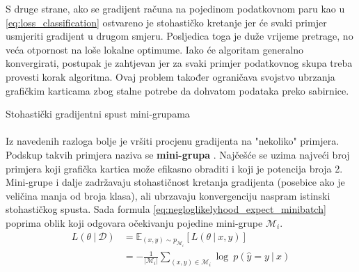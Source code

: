 \documentclass[times, utf8, numeric, diplomski]{fer}
\def\expect{\mathbb{E}}
\def\probsep{\ |\ }
\def\dataset{\mathcal{D}}
\def\minibatch{\mathcal{M}}
\begin{document}
S druge strane, ako se gradijent računa na pojedinom podatkovnom paru kao u \eqref{eq:loss_classification} ostvareno je stohastičko kretanje jer će svaki primjer usmjeriti gradijent u drugom smjeru. Posljedica toga je duže vrijeme pretrage, no veća otpornost na loše lokalne optimume. Iako će algoritam generalno konvergirati, postupak je zahtjevan jer za svaki primjer podatkovnog skupa treba provesti korak algoritma. Ovaj problem također ograničava svojstvo ubrzanja grafičkim karticama zbog stalne potrebe da dohvatom podataka preko sabirnice.

\begin{algorithm}[H]
\begin{algorithmic}
	\FOR{$\minibatch_i \in \dataset$} \STATE {
		$\vec{g}_i \gets \frac{1}{|\minibatch|} \sum_{(\vec{x},\vec{y})\in\minibatch} \vec{\nabla}_{\theta} L(\theta \probsep \vec{x},\vec{y})$ \\
		$\vec{\theta}_{i+1} \gets \vec{\theta}_i - \eta \cdot \vec{g_i}$
	 } \ENDFOR
\ENDWHILE
{}
\end{algorithmic}
\caption{Stohastički gradijentni spust mini-grupama}
\label{alg:sgd}
\end{algorithm}

\paragraph{}
Iz navedenih razloga bolje je vršiti procjenu gradijenta na "nekoliko" primjera. Podskup takvih primjera naziva se \textbf{mini-grupa} . Najčešće se uzima najveći broj primjera koji grafička kartica može efikasno obraditi i koji je potencija broja 2. Mini-grupe i dalje zadržavaju stohastičnost kretanja gradijenta (posebice ako je veličina manja od broja klasa), ali ubrzavaju konvergenciju naspram istinski stohastičkog spusta. Sada formula \eqref{eq:negloglikelyhood_expect_minibatch} poprima oblik koji odgovara očekivanju pojedine mini-grupe $\minibatch_i$.
\begin{equation}
\label{eq:negloglikelyhood_expect_minibatch}
\begin{split}
L(\theta \probsep \dataset) &= \expect_{(x,y) \sim p_{\minibatch_i}}[L(\theta \probsep x,y)] \\
&= -\frac{1}{|\minibatch_i|} \sum_{(x,y)\in\minibatch_i} \log\ p(\hat{y}=y \probsep x)
\end{split}
\end{equation}
\end{document}
